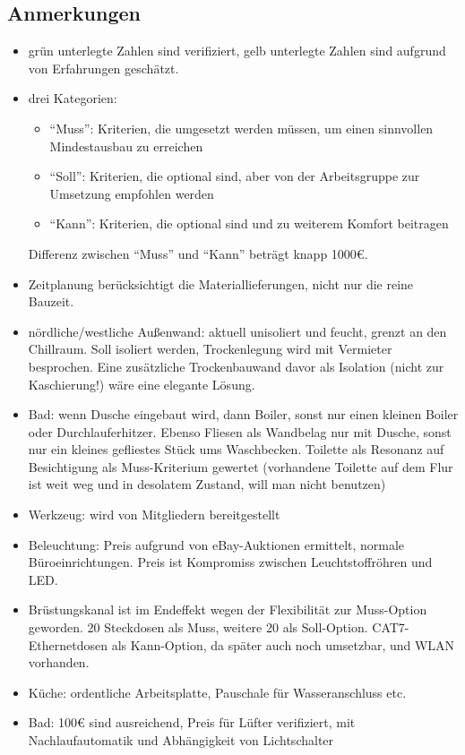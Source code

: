 \documentclass[a4paper,12pt]{scrartcl}
\begin{document}
\subsection{Anmerkungen}
\begin{itemize}
  \item grün unterlegte Zahlen sind verifiziert, gelb unterlegte Zahlen sind
    aufgrund von Erfahrungen geschätzt.
  \item drei Kategorien:
    \begin{itemize}
      \item "`Muss"': Kriterien, die umgesetzt werden müssen, um einen sinnvollen
        Mindestausbau zu erreichen
      \item "`Soll"': Kriterien, die optional sind, aber von der Arbeitsgruppe
        zur Umsetzung empfohlen werden
      \item "`Kann"': Kriterien, die optional sind und zu weiterem Komfort
        beitragen
      \end{itemize}
    Differenz zwischen "`Muss"' und "`Kann"' beträgt knapp 1000€.
  \item Zeitplanung berücksichtigt die Materiallieferungen, nicht nur die reine
    Bauzeit.
  \item nördliche/westliche Außenwand: aktuell unisoliert und feucht, grenzt an
    den Chillraum. Soll isoliert werden, Trockenlegung wird mit Vermieter
    besprochen. Eine zusätzliche Trockenbauwand davor als Isolation (nicht zur
    Kaschierung!) wäre eine elegante Lösung.
  \item Bad: wenn Dusche eingebaut wird, dann Boiler, sonst nur einen kleinen
    Boiler oder Durchlauferhitzer. Ebenso Fliesen als Wandbelag nur mit Dusche,
    sonst nur ein kleines gefliestes Stück ums Waschbecken. Toilette als
    Resonanz auf Besichtigung als Muss-Kriterium gewertet (vorhandene Toilette
    auf dem Flur ist weit weg und in desolatem Zustand, will man nicht benutzen)
  \item Werkzeug: wird von Mitgliedern bereitgestellt
  \item Beleuchtung: Preis aufgrund von eBay-Auktionen ermittelt, normale
    Büroeinrichtungen. Preis ist Kompromiss zwischen Leuchtstoffröhren und LED.
  \item Brüstungskanal ist im Endeffekt wegen der Flexibilität zur Muss-Option
    geworden. 20 Steckdosen als Muss, weitere 20 als Soll-Option.
    CAT7-Ethernetdosen als Kann-Option, da später auch noch umsetzbar, und WLAN
    vorhanden.
  \item Küche: ordentliche Arbeitsplatte, Pauschale für Wasseranschluss etc.
  \item Bad: 100€ sind ausreichend, Preis für Lüfter verifiziert, mit
    Nachlaufautomatik und Abhängigkeit von Lichtschalter
\end{itemize}
\end{document}
